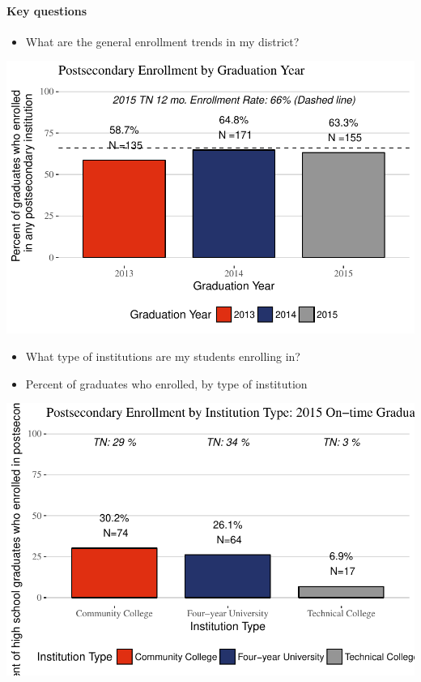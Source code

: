 \documentclass[11pt,]{article}
\providecommand{\tightlist}{%
  \setlength{\itemsep}{0pt}\setlength{\parskip}{0pt}}
\let\oldparagraph\paragraph
\renewcommand{\paragraph}[1]{\oldparagraph{#1}\mbox{}}
\begin{document}
\newpage

\paragraph{Key questions}\label{key-questions}

\begin{itemize}
\tightlist
\item
  What are the general enrollment trends in my district?
\end{itemize}

\begin{center}\includegraphics{20170411_PSWRR_no_CTE_files/figure-latex/Enrollment over time-1} \end{center}

\begin{itemize}
\item
  What type of institutions are my students enrolling in?
\item
  Percent of graduates who enrolled, by type of institution
\end{itemize}

\begin{center}\includegraphics{20170411_PSWRR_no_CTE_files/figure-latex/District by Type-1} \end{center}
\end{document}
